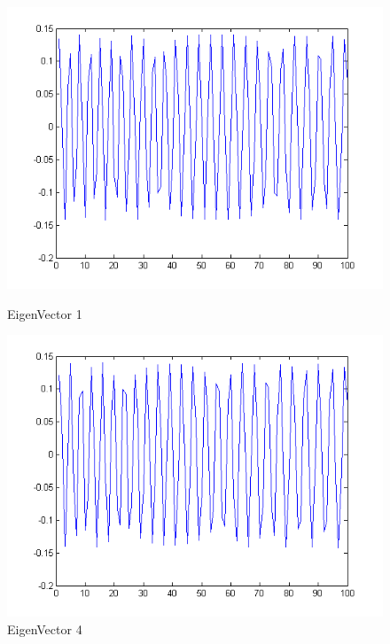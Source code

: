 \documentclass[12pt]{article}
\begin{document}
\begin{figure}[H]
\begin{minipage}[b]{0.5\linewidth}
\includegraphics[scale=.5]{v3p1.png}
\caption{EigenVector 1}
\end{minipage}
\begin{minipage}[b]{0.5\linewidth}
\includegraphics[scale=.5]{v3p4.png}
\caption{EigenVector 4}
\end{minipage}
\end{figure}
\end{document}
